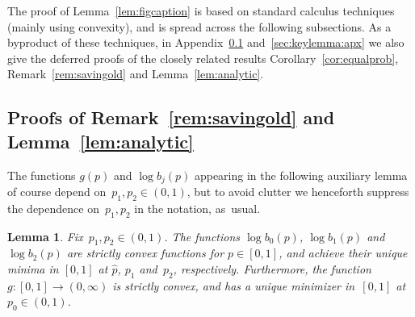 \documentclass{article}
\newcommand{\ps}{\hat{p}}
\newtheorem{lemma}[thm]{Lemma}
\begin{document}
The proof of Lemma~\ref{lem:figcaption} is based on standard calculus techniques (mainly using convexity), and is spread across the following subsections.
As a byproduct of these techniques, in Appendix~\ref{sec:deferred1} and~\ref{sec:keylemma:apx}
we also give the deferred proofs of the closely related results Corollary~\ref{cor:equalprob}, Remark~\ref{rem:savingold} and Lemma~\ref{lem:analytic}. 




\subsection{Proofs of Remark~\ref{rem:savingold} and  Lemma~\ref{lem:analytic}} \label{sec:deferred1}
The functions $g(p)$ and ${\log b_j(p)}$ appearing in the following auxiliary lemma of course depend on~$p_1,p_2 \in (0,1)$, but to avoid clutter we henceforth suppress the dependence on~$p_1,p_2$ in the notation, as~usual.
\begin{lemma}\label{lem:strictlyconvex}
Fix~$p_1,p_2 \in (0,1)$. 
The functions $\log b_0(p)$, $\log b_1(p)$ and~$\log b_2(p)$ are strictly convex functions for $p\in [0,1]$, and achieve their unique minima in $[0,1]$ at $\ps$, $p_1$ and~$p_2$, respectively.
Furthermore, 
the function~$g:[0,1] \to (0,\infty)$ is strictly convex, and has a unique minimizer in~$[0,1]$ at~$p_0 \in (0,1)$.
\end{lemma}
\end{document}
